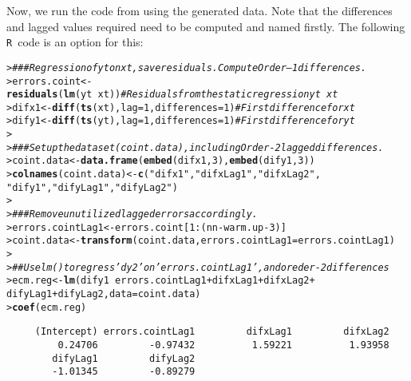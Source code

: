 \documentclass[a4paper, 11pt]{article}\usepackage[]{graphicx}\usepackage[]{color}
\makeatletter
\newcommand{\hlnum}[1]{\textcolor[rgb]{0.686,0.059,0.569}{#1}}%
\newcommand{\hlstr}[1]{\textcolor[rgb]{0.192,0.494,0.8}{#1}}%
\newcommand{\hlcom}[1]{\textcolor[rgb]{0.678,0.584,0.686}{\textit{#1}}}%
\newcommand{\hlopt}[1]{\textcolor[rgb]{0,0,0}{#1}}%
\newcommand{\hlstd}[1]{\textcolor[rgb]{0.345,0.345,0.345}{#1}}%
\newcommand{\hlkwb}[1]{\textcolor[rgb]{0.69,0.353,0.396}{#1}}%
\newcommand{\hlkwc}[1]{\textcolor[rgb]{0.333,0.667,0.333}{#1}}%
\newcommand{\hlkwd}[1]{\textcolor[rgb]{0.737,0.353,0.396}{\textbf{#1}}}%
\newenvironment{kframe}{%
 \def\at@end@of@kframe{}%
 \ifinner\ifhmode%
  \def\at@end@of@kframe{\end{minipage}}%
  \begin{minipage}{\columnwidth}%
 \fi\fi%
 \def\FrameCommand##1{\hskip\@totalleftmargin \hskip-\fboxsep
 \colorbox{shadecolor}{##1}\hskip-\fboxsep
     \hskip-\linewidth \hskip-\@totalleftmargin \hskip\columnwidth}%
 \MakeFramed {\advance\hsize-\width
   \@totalleftmargin\z@ \linewidth\hsize
   \@setminipage}}%
 {\par\unskip\endMakeFramed%
 \at@end@of@kframe}
\newenvironment{knitrout}{}{} %
\newcommand{\Rcol}{{\color{blue} {\large \texttt{R}}}~}
\makeatother
\begin{document}
Now, we run the code from \cite{pfaf:2011} using
the generated data. Note that the differences and lagged values
required need to be computed and named firstly. 
The following \Rcol code is an option for this:

\begin{knitrout}\scriptsize
{}\color{fgcolor}\begin{kframe}
\begin{alltt}
\hlstd{> }\hlcom{### Regression of yt on xt, save residuals. Compute Order--1 differences.}
\hlstd{> }\hlstd{errors.coint} \hlkwb{<-} \hlkwd{residuals}\hlstd{(}\hlkwd{lm}\hlstd{(yt} \hlopt{~} \hlstd{xt))}  \hlcom{# Residuals from the static regression yt ~ xt}
\hlstd{> }\hlstd{difx1} \hlkwb{<-} \hlkwd{diff}\hlstd{(}\hlkwd{ts}\hlstd{(xt),} \hlkwc{lag} \hlstd{=} \hlnum{1}\hlstd{,} \hlkwc{differences} \hlstd{=} \hlnum{1}\hlstd{)}  \hlcom{# First difference for xt}
\hlstd{> }\hlstd{dify1} \hlkwb{<-} \hlkwd{diff}\hlstd{(}\hlkwd{ts}\hlstd{(yt),} \hlkwc{lag} \hlstd{=} \hlnum{1}\hlstd{,} \hlkwc{differences} \hlstd{=} \hlnum{1}\hlstd{)}  \hlcom{# First difference for yt}
\hlstd{> }
\hlstd{> }\hlcom{### Set up the dataset (coint.data), including Order-2 lagged differences.}
\hlstd{> }\hlstd{coint.data} \hlkwb{<-} \hlkwd{data.frame}\hlstd{(}\hlkwd{embed}\hlstd{(difx1,} \hlnum{3}\hlstd{),} \hlkwd{embed}\hlstd{(dify1,} \hlnum{3}\hlstd{))}
\hlstd{> }\hlkwd{colnames}\hlstd{(coint.data)} \hlkwb{<-} \hlkwd{c}\hlstd{(}\hlstr{"difx1"}\hlstd{,} \hlstr{"difxLag1"}\hlstd{,} \hlstr{"difxLag2"}\hlstd{,}
\hlstd{  }                          \hlstr{"dify1"}\hlstd{,} \hlstr{"difyLag1"}\hlstd{,} \hlstr{"difyLag2"}\hlstd{)}
\hlstd{> }
\hlstd{> }\hlcom{### Remove unutilized lagged errors accordingly.}
\hlstd{> }\hlstd{errors.cointLag1} \hlkwb{<-} \hlstd{errors.coint[}\hlnum{1}\hlopt{:}\hlstd{(nn} \hlopt{-} \hlstd{warm.up} \hlopt{-} \hlnum{3}\hlstd{)]}
\hlstd{> }\hlstd{coint.data} \hlkwb{<-} \hlkwd{transform}\hlstd{(coint.data,} \hlkwc{errors.cointLag1} \hlstd{= errors.cointLag1)}
\hlstd{> }
\hlstd{> }\hlcom{## Use lm() to regress 'dy2' on 'errors.cointLag1', and oreder-2 differences}
\hlstd{> }\hlstd{ecm.reg} \hlkwb{<-} \hlkwd{lm}\hlstd{(dify1} \hlopt{~} \hlstd{errors.cointLag1} \hlopt{+} \hlstd{difxLag1} \hlopt{+} \hlstd{difxLag2} \hlopt{+}
\hlstd{  }                \hlstd{difyLag1} \hlopt{+} \hlstd{difyLag2,} \hlkwc{data} \hlstd{= coint.data)}
\hlstd{> }\hlkwd{coef}\hlstd{(ecm.reg)}
\end{alltt}
\begin{verbatim}
     (Intercept) errors.cointLag1         difxLag1         difxLag2 
         0.24706         -0.97432          1.59221          1.93958 
        difyLag1         difyLag2 
        -1.01345         -0.89279 
\end{verbatim}
\end{kframe}
\end{knitrout}
\end{document}
